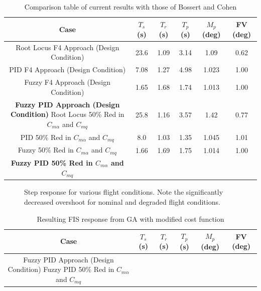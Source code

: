 \documentclass[12pt]{article}
\newcommand{\testdir}{test}
\begin{document}
\begin{table}[h]
	\centering
	\caption{Comparison table of current results with those of Bossert and Cohen}\label{t:f4}
	\begin{tabular}{|c|c|c|c|c|c|}\hline
	Case & $T_s$ (s) & $T_r$ (s) & $T_p$ (s) & $M_p$ (deg) & FV (deg) \\\hline
	Root Locus F4 Approach (Design Condition) & 23.6 & 1.09 & 3.14 & 1.09 & 0.62 \\\hline
	PID F4 Approach (Design Condition) & 7.08 & 1.27 & 4.98 & 1.023 & 1.00 \\\hline
	Fuzzy F4 Approach (Design Condition) & 1.65 & 1.68 & 1.74 & 1.013 & 1.00 \\\hline
	\textbf{Fuzzy PID Approach (Design Condition)} 
	Root Locus 50\% Red in $C_{m\alpha}$ and $C_{mq}$ & 25.8 & 1.16 & 3.57 & 1.42 & 0.77 \\\hline
	PID 50\% Red in $C_{m\alpha}$ and $C_{mq}$ & 8.0 & 1.03 & 1.35 & 1.045 & 1.01 \\\hline
	Fuzzy 50\% Red in $C_{m\alpha}$ and $C_{mq}$ & 1.66 & 1.69 & 1.75 & 1.014 & 1.00 \\\hline
	\textbf{Fuzzy PID 50\% Red in $C_{m\alpha}$ and $C_{mq}$} 
	\end{tabular}
\end{table}

\begin{figure}[h]
	\centering
	\begin{subfigmatrix}{2}
	\end{subfigmatrix}
	\caption{Step response for various flight conditions. Note the significantly decreased overshoot for nominal and degraded flight conditions.}\label{f:f4_nos}
\end{figure}

\begin{table}[h]
	\centering
	\caption{Resulting FIS response from GA with modified cost function}\label{t:f4_nos}
	\begin{tabular}{|c|c|c|c|c|c|}\hline
	Case & $T_s$ (s) & $T_r$ (s) & $T_p$ (s) & $M_p$ (deg) & FV (deg) \\\hline
	Fuzzy PID Approach (Design Condition) 
	Fuzzy PID 50\% Red in $C_{m\alpha}$ and $C_{mq}$ 
	\end{tabular}
\end{table}
\end{document}

